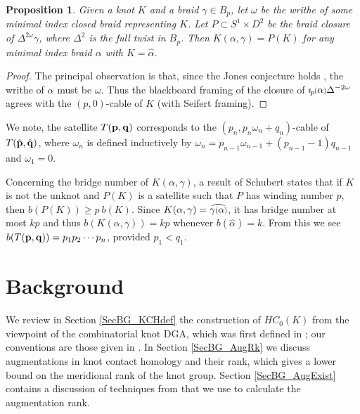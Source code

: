 \documentclass[11pt]{amsart}
\newcommand*{\smallp}[1]{\scalebox{.75}{\ensuremath#1}}
\newcommand{\pp}[2][p]{\imath_{\hspace*{-1pt}#1}\hspace*{-.5pt}\smallp(#2\smallp)}
\newtheorem{prop}[thm]{Proposition}
\theoremstyle{definition}
\begin{document}
\begin{prop}\label{PropAsSatelliteOp}Given a knot $K$ and a braid $\gamma\in B_p$, let $\omega$ be the writhe of some minimal index closed braid representing $K$. Let $P\subset S^1\times D^2$ be the braid closure of $\Delta^{2\omega}\gamma$, where $\Delta^2$ is the full twist in $B_p$. Then $K(\alpha,\gamma) = P(K)$ for any minimal index braid $\alpha$ with $K=\hat{\alpha}$.
\end{prop}
\begin{proof}The principal observation is that, since the Jones conjecture holds \cite{DP12,LM12}, the writhe of $\alpha$ must be $\omega$. Thus the blackboard framing of the closure of $\pp\alpha\Delta^{-2\omega}$ agrees with the $(p,0)$-cable of $K$ (with Seifert framing).
\end{proof}

We note, the satellite $T({\bf p},{\bf q})$ corresponds to the $(p_n,p_n\omega_n+q_n)$-cable of $T(\hat{\bf p},\hat{\bf q})$, where $\omega_n$ is defined inductively by $\omega_n=p_{n-1}\omega_{n-1}+(p_{n-1}-1)q_{n-1}$ and $\omega_1=0$.

Concerning the bridge number of $K(\alpha,\gamma)$, a result of Schubert \cite{} states that if $K$ is not the unknot and $P(K)$ is a satellite such that $P$ has winding number $p$, then $b(P(K)) \ge p\ b(K)$. Since $K(\alpha,\gamma) = \widehat{\gamma\smallp(\alpha\smallp)}$, it has bridge number at most $kp$ and thus $b(K(\alpha,\gamma)) = kp$ whenever $b(\hat\alpha) = k$. From this we see $b(T({\bf p},{\bf q})) = p_1p_2\cdots p_n$, provided $p_1 < q_1$.

\section{Background}
\label{SecBG}

  We review in Section \ref{SecBG_KCHdef} the construction of $HC_0(K)$ from the viewpoint of the combinatorial knot DGA, which was first defined in \cite{Ng08}; our conventions are those given in \cite{Ng12}. In Section \ref{SecBG_AugRk} we discuss augmentations in knot contact homology and their rank, which gives a lower bound on the meridional rank of the knot group. Section \ref{SecBG_AugExist} contains a discussion of techniques from \cite{Cor13a} that we use to calculate the augmentation rank.
\end{document}

